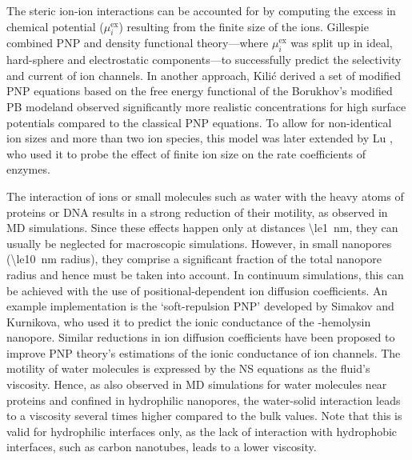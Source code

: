 \documentclass[twoside,twocolumn,9pt]{article}
\begin{document}
The steric ion-ion interactions can be accounted for by computing the excess in chemical potential
($\mu_{i}^\text{ex}$) resulting from the finite size of the ions.\cite{Eisenberg-1996,Bazant-2009,
Daiguji-2010} Gillespie \etal{} combined PNP and density functional theory---where $\mu_{i}^\text{ex}$ was
split up in ideal, hard-sphere and electrostatic components---to successfully predict the selectivity and
current of ion channels.\cite{Gillespie-2002} In another approach, Kili\'{c} \etal{} derived a set of modified
PNP equations based on the free energy functional of the Borukhov's modified PB model\cite{Borukhov-1997}and
observed significantly more realistic concentrations for high surface potentials compared to the classical PNP
equations.\cite{Kilic-2007} To allow for non-identical ion sizes and more than two ion species, this model was
later extended by Lu \etal{}, who used it to probe the effect of finite ion size on the rate coefficients of
enzymes.\cite{Lu-2011}

The interaction of ions or small molecules such as water with the heavy atoms of proteins or DNA results in a
strong reduction of their motility, as observed in MD simulations.\cite{Makarov-1998,Pronk-2014,Wilson-2019}
Since these effects happen only at distances \SI{\le1}{\nm}, they can usually be neglected for macroscopic
simulations. However, in small nanopores (\SI{\le10}{\nm} radius), they comprise a significant fraction of the
total nanopore radius and hence must be taken into
account.\cite{Noskov-2004,Simakov-2010,Pederson-2015,McMullen-2017} In continuum simulations, this can be
achieved with the use of positional-dependent ion diffusion coefficients. An example implementation is the
`soft-repulsion PNP' developed by Simakov and Kurnikova,\cite{Simakov-2010,Simakov-2018} who used it to
predict the ionic conductance of the \textalpha-hemolysin nanopore. Similar reductions in ion diffusion
coefficients have been proposed to improve PNP theory's estimations of the ionic conductance of ion
channels.\cite{Furini-2006,Liu-2015,DeBiase-2015} The motility of water molecules is expressed by the NS
equations as the fluid's viscosity. Hence, as also observed in MD simulations for water molecules near
proteins\cite{Pronk-2014} and confined in hydrophilic nanopores,\cite{Qiao-Aluru-2003,Vo-2016,Hsu-2017} the
water-solid interaction leads to a viscosity several times higher compared to the bulk values. Note that this
is valid for hydrophilic interfaces only, as the lack of interaction with hydrophobic interfaces, such as
carbon nanotubes, leads to a lower viscosity.\cite{Ye-2011}
\end{document}
